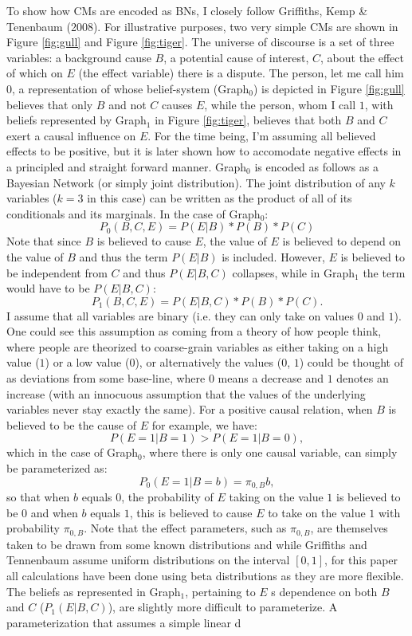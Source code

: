 \documentclass[11pt]{article}
\begin{document}
To show how CMs are encoded as BNs, I closely follow Griffiths, Kemp \& Tenenbaum (2008). For illustrative purposes, two very simple CMs are shown in Figure \ref{fig:gull} and Figure \ref{fig:tiger}. The universe of discourse is a set of three variables: a background cause $B$, a potential cause of interest, $C$, about the effect of which on $E$ (the effect variable) there is a dispute. The person, let me call him $0$, a representation of whose belief-system (Graph$_0$) is depicted in Figure \ref{fig:gull} believes that only $B$ and not $C$ causes $E$, while the person, whom I call $1$, with beliefs represented by Graph$_1$ in Figure \ref{fig:tiger}, believes that both $B$ and $C$ exert a causal influence on $E$. For the time being, I'm assuming all believed effects to be positive, but it is later shown how to accomodate negative effects in a principled and straight forward manner. Graph$_0$ is encoded as follows as a Bayesian Network (or simply joint distribution). The joint distribution of any $k$ variables ($k=3$ in this case) can be written as the product of all of its conditionals and its marginals. In the case of Graph$_0$:
$$P_0(B, C, E)= P(E | B)*P(B)*P(C)$$
Note that since $B$ is believed to cause $E$, the value of $E$ is believed to depend on the value of $B$ and thus the term $P(E | B)$ is included. However, $E$ is believed to be independent from $C$ and thus $P(E | B, C)$ collapses, while in Graph$_1$ the term would have to be $P(E | B, C)$:
$$P_1(B, C, E)= P(E | B, C)*P(B)*P(C).$$
I assume that all variables are binary (i.e. they can only take on values $0$ and $1$). One could see this assumption as coming from a theory of how people think, where people are theorized to coarse-grain variables as either taking on a high value ($1$) or a low value ($0$), or alternatively the values ($0$, $1$) could be thought of as deviations from some base-line, where $0$ means a decrease and $1$ denotes an increase (with an innocuous assumption that the values of the underlying variables never stay exactly the same).
For a positive causal relation, when $B$ is believed to be the cause of $E$ for example, we have:
$$P(E=1 | B=1) > P(E=1 | B=0),$$
which in the case of Graph$_0$, where there is only one causal variable, can simply be parameterized as:
$$P_0(E=1 | B=b) = \pi_{0, B}b,$$
so that when $b$ equals $0$, the probability of $E$ taking on the value $1$ is believed to be $0$ and when $b$ equals $1$, this is believed to cause $E$ to take on the value $1$ with probability $\pi_{0, B}$. Note that the effect parameters, such as $\pi_{0, B}$, are themselves taken to be drawn from some known distributions and while Griffiths and Tennenbaum assume uniform distributions on the interval $\left[0, 1\right]$, for this paper all calculations have been done using beta distributions as they are more flexible. The beliefs as represented in Graph$_1$, pertaining to $E$ s dependence on both $B$ and $C$ ($P_1(E | B, C)$), are slightly more difficult to parameterize. A parameterization that assumes a simple linear d
\end{document}
